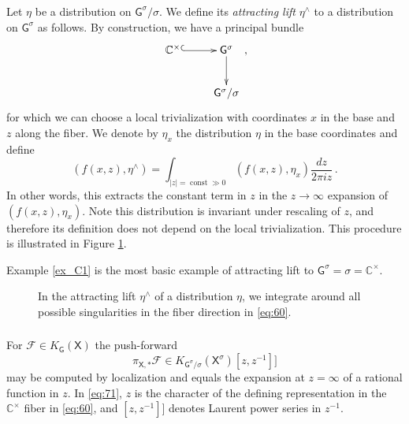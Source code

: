 \documentclass[14pt]{extarticle}
\newcommand{\C}{\mathbb{C}}
\newcommand{\Ct}{\mathbb{C}^\times}
\newcommand{\bG}{\mathsf{G}}
\newcommand{\bX}{\mathsf{X}}
\newcommand{\cF}{\mathscr{F}}
\DeclareMathOperator{\const}{const}
\theoremstyle{definition}
\begin{document}
\subsubsection{}

Let $\eta$ be a distribution on $\bG^\sigma/\sigma$. We define its
\emph{attracting lift} $\eta^\wedge$ to a distribution on $\bG^\sigma$ as follows. By construction, we
have a principal bundle
%
\begin{equation}
  \label{eq:60}
  \xymatrix{
    \Ct \ar@{^{(}->}[r]  & \bG^\sigma \ar[d] \\
    & \bG^\sigma/\sigma } \,, 
\end{equation}
%
for which we can choose a local trivialization with coordinates $x$ in
the base and $z$ along the fiber. We denote by $\eta_x$ the
distribution $\eta$ in the base coordinates and define 
\[
  (f(x,z), \eta^\wedge) = \int_{|z|=\const \gg 0} (f(x,z),\eta_x)
\frac{dz}{2\pi i z} \,.
\]
In other words, this extracts the constant term in $z$ in the $z\to
\infty$ expansion of $(f(x,z),\eta_x)$. Note this distribution is
invariant under rescaling of $z$, and therefore its definition does
not depend on the local trivialization. This procedure is illustrated
in Figure \ref{lift_eta}. 

Example \ref{ex_C1} is the most basic example of attracting lift
to $\bG^\sigma = \sigma = \Ct$. 


\begin{figure}[!h]
  \centering
  \def\svgwidth{7cm}
  \caption{In the attracting lift $\eta^\wedge$ of a distribution $\eta$, we
    integrate around all possible singularities in the fiber
    direction in \eqref{eq:60}.}
\label{lift_eta}
\end{figure}



\subsubsection{}


For $\cF\in K_{\bG}(\bX)$ the push-forward
%
\begin{equation}
  \label{eq:71}
  \pi_{\bX,*} \cF \in K_{\bG^\sigma/\sigma}(\bX^\sigma)[z,z^{-1}]] 
\end{equation}
%
may be computed by localization and equals the expansion at
$z=\infty$ of a rational function in $z$. In \eqref{eq:71}, $z$ is the
character of the defining representation in the $\C^\times$ fiber in
\eqref{eq:60}, and $[z,z^{-1}]]$ denotes Laurent power series in
$z^{-1}$.
\end{document}
